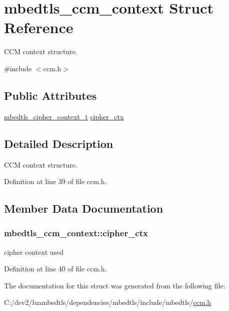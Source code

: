 \hypertarget{structmbedtls__ccm__context}{\section{mbedtls\-\_\-ccm\-\_\-context Struct Reference}
\label{structmbedtls__ccm__context}
}


C\-C\-M context structure.  




{\ttfamily \#include $<$ccm.\-h$>$}

\subsection*{Public Attributes}
\begin{DoxyCompactItemize}
\item 
\hyperlink{structmbedtls__cipher__context__t}{mbedtls\-\_\-cipher\-\_\-context\-\_\-t} \hyperlink{structmbedtls__ccm__context_a6d270f32b6d211bc94be981ac7572b1e}{cipher\-\_\-ctx}
\end{DoxyCompactItemize}


\subsection{Detailed Description}
C\-C\-M context structure. 

Definition at line 39 of file ccm.\-h.



\subsection{Member Data Documentation}
\hypertarget{structmbedtls__ccm__context_a6d270f32b6d211bc94be981ac7572b1e}{
\subsubsection[{cipher\-\_\-ctx}]{ mbedtls\-\_\-ccm\-\_\-context\-::cipher\-\_\-ctx}}\label{structmbedtls__ccm__context_a6d270f32b6d211bc94be981ac7572b1e}
cipher context used 

Definition at line 40 of file ccm.\-h.



The documentation for this struct was generated from the following file\-:\begin{DoxyCompactItemize}
\item 
C\-:/dev2/luambedtls/dependencies/mbedtls/include/mbedtls/\hyperlink{ccm_8h}{ccm.\-h}\end{DoxyCompactItemize}
